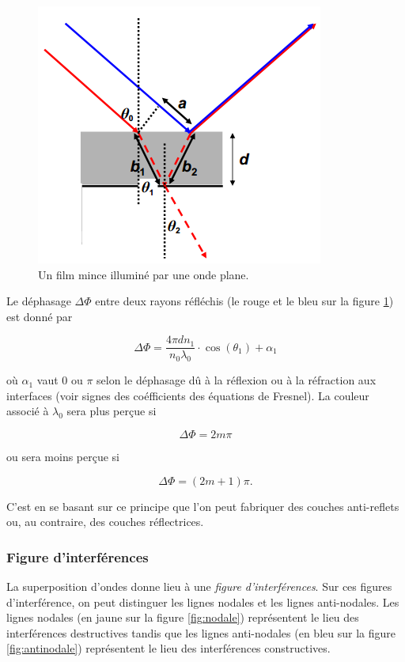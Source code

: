 \begin{figure}[ht!]
	\centering
		\includegraphics[scale=1.0]{img/film-mince.png}
		\caption{Un film mince illuminé par une onde plane.}
		\label{fig:film-mince}
\end{figure}

Le déphasage $\Delta \Phi$ entre deux rayons
réfléchis (le rouge et le bleu sur la figure \ref{fig:film-mince})
est donné par

$$\Delta \Phi = \frac{4\pi dn_1}{n_0\lambda_0}\cdot\cos(\theta_1) + \alpha_1$$

où $\alpha_1$ vaut 0 ou $\pi$ selon le déphasage dû à la
réflexion ou à la réfraction aux interfaces (voir signes
des coéfficients des équations de Fresnel).
La couleur associé à $\lambda_0$ sera plus perçue si

$$\Delta \Phi = 2m\pi$$

ou sera moins perçue si

$$\Delta \Phi = (2m+1)\pi.$$

C'est en se basant sur ce principe que l'on peut
fabriquer des couches anti-reflets ou, au contraire,
des couches réflectrices.

\subsubsection{Figure d'interférences}
La superposition d'ondes donne lieu à une \emph{figure
d'interférences}. Sur ces figures d'interférence, on
peut distinguer les lignes nodales et les lignes anti-nodales.
Les lignes nodales (en jaune sur la figure \ref{fig:nodale})
représentent le lieu des interférences destructives tandis que
les lignes anti-nodales (en bleu sur la figure \ref{fig:antinodale})
représentent le lieu des interférences constructives.

